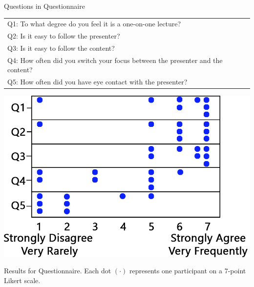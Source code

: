 \documentclass[sigchi-a]{acmart}
\begin{document}
\begin{margintable}
    \caption{Questions in Questionnaire}
    \label{tab:table2}
    \begin{tabular}{p{5.5cm}}
    \toprule
      Q1: To what degree do you feel it is a one-on-one lecture?\\
      Q2: Is it easy to follow the presenter?\\
      Q3: Is it easy to follow the content?\\
      Q4: How often did you switch your focus between the presenter and the content?\\
      Q5: How often did you have eye contact with the presenter?\\
      \bottomrule
    \end{tabular}
\end{margintable}

\begin{marginfigure}
    \includegraphics[width=\marginparwidth]{lbwResults}
    \caption{Results for Questionnaire. Each dot $\left(\cdot\right)$ represents one participant on a 7-point Likert scale.}
    \label{fig:results}
\end{marginfigure}



\end{document}
